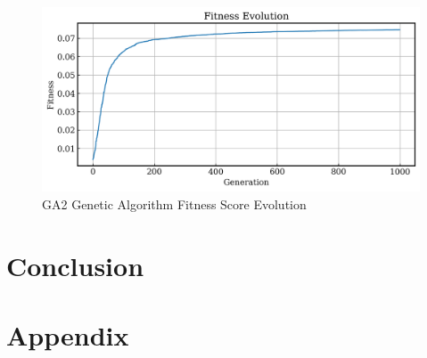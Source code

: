 \documentclass{article}
\begin{document}
\begin{figure}[H]
    \centering
    \includegraphics[width=0.75\linewidth]{figures/GAResults/GA3/1000gens_10pars_100initpop_5pcent_mut.png}
    \caption{GA2 Genetic Algorithm Fitness Score Evolution}
    \label{fig:GA3_fitness}
\end{figure}


\newpage{}

\section{Conclusion}

\newpage{}
\section{Appendix}











\newpage{}


\end{document}
